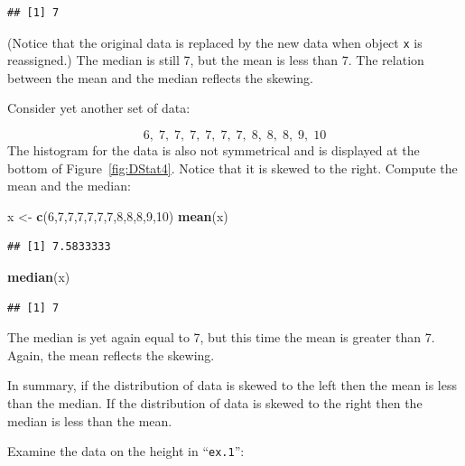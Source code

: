 \documentclass[]{krantz}
\makeatletter
\newenvironment{Shaded}{\begin{snugshade}}{\end{snugshade}}
\newcommand{\DecValTok}[1]{\textcolor[rgb]{0.00,0.00,0.81}{#1}}
\newcommand{\FloatTok}[1]{\textcolor[rgb]{0.00,0.00,0.81}{#1}}
\newcommand{\KeywordTok}[1]{\textcolor[rgb]{0.13,0.29,0.53}{\textbf{#1}}}
\newcommand{\NormalTok}[1]{#1}
\newcommand{\OperatorTok}[1]{\textcolor[rgb]{0.81,0.36,0.00}{\textbf{#1}}}
\newcommand{\StringTok}[1]{\textcolor[rgb]{0.31,0.60,0.02}{#1}}
\newenvironment{kframe}{%
\medskip{}
\setlength{\fboxsep}{.8em}
 \def\at@end@of@kframe{}%
 \ifinner\ifhmode%
  \def\at@end@of@kframe{\end{minipage}}%
  \begin{minipage}{\columnwidth}%
 \fi\fi%
 \def\FrameCommand##1{\hskip\@totalleftmargin \hskip-\fboxsep
 \colorbox{shadecolor}{##1}\hskip-\fboxsep
     \hskip-\linewidth \hskip-\@totalleftmargin \hskip\columnwidth}%
 \MakeFramed {\advance\hsize-\width
   \@totalleftmargin\z@ \linewidth\hsize
   \@setminipage}}%
 {\par\unskip\endMakeFramed%
 \at@end@of@kframe}
\renewenvironment{Shaded}{\begin{kframe}}{\end{kframe}}
\theoremstyle{definition}
\theoremstyle{definition}
\theoremstyle{definition}
\theoremstyle{remark}
\makeatother
\begin{document}
\begin{verbatim}
## [1] 7
\end{verbatim}

(Notice that the original data is replaced by the new data when object
\texttt{x} is reassigned.) The median is still 7, but the mean is less than 7.
The relation between the mean and the median reflects the skewing.

Consider yet another set of data:

\[6,\;  7,\;  7,\;  7,\;  7,\;  7,\;  7,\;  8,\;  8,\;  8,\;  9,\;  10\]
The histogram for the data is also not symmetrical and is displayed at
the bottom of Figure~\ref{fig:DStat4}. Notice that it is
skewed to the right. Compute the mean and the median:

\begin{Shaded}
\begin{Highlighting}[]
\NormalTok{x <-}\StringTok{ }\KeywordTok{c}\NormalTok{(}\DecValTok{6}\NormalTok{,}\DecValTok{7}\NormalTok{,}\DecValTok{7}\NormalTok{,}\DecValTok{7}\NormalTok{,}\DecValTok{7}\NormalTok{,}\DecValTok{7}\NormalTok{,}\DecValTok{7}\NormalTok{,}\DecValTok{8}\NormalTok{,}\DecValTok{8}\NormalTok{,}\DecValTok{8}\NormalTok{,}\DecValTok{9}\NormalTok{,}\DecValTok{10}\NormalTok{)}
\KeywordTok{mean}\NormalTok{(x)}
\end{Highlighting}
\end{Shaded}

\begin{verbatim}
## [1] 7.5833333
\end{verbatim}

\begin{Shaded}
\begin{Highlighting}[]
\KeywordTok{median}\NormalTok{(x)}
\end{Highlighting}
\end{Shaded}

\begin{verbatim}
## [1] 7
\end{verbatim}

The median is yet again equal to 7, but this time the mean is greater
than 7. Again, the mean reflects the skewing.

In summary, if the distribution of data is skewed to the left then the
mean is less than the median. If the distribution of data is skewed to
the right then the median is less than the mean.

Examine the data on the height in ``\texttt{ex.1}'':

\begin{Shaded}
\end{Shaded}
\end{document}
